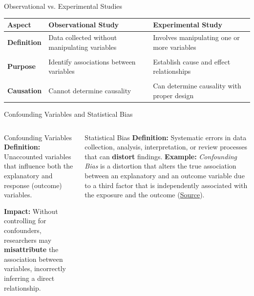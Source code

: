 \documentclass[handout]{beamer} %
\begin{document}
\begin{frame}{Observational vs. Experimental Studies}
    \begin{tabular}{ l | p{} | p{} }
        \textbf{Aspect} & \textbf{Observational Study} & \textbf{Experimental Study} \\
        \hline
        \textbf{Definition} & Data collected without manipulating variables & Involves manipulating one or more variables \\ \pause  %
        & & \\
        \textbf{Purpose} & Identify associations between variables & Establish cause and effect relationships \\ \pause  %
                & & \\
        \textbf{Causation} & Cannot determine causality & Can determine causality with proper design \\
    \end{tabular}
\end{frame}

\begin{frame}{Confounding Variables and Statistical Bias}

    \begin{columns}[T] %
            \begin{block}{Confounding Variables}
                \textbf{Definition:} Unaccounted variables that influence both the explanatory and response (outcome) variables. \pause %
                
                \vspace{0.2cm}
                
                \textbf{Impact:} Without controlling for confounders, researchers may \textbf{misattribute} the association between variables, incorrectly inferring a direct relationship. \pause %
            \end{block}
        
            \begin{block}{Statistical Bias}
                \textbf{Definition:} Systematic errors in data collection, analysis, interpretation, or review processes that can \textbf{distort} findings.
                \pause %
                \vspace{0.2cm}
                \textbf{Example:} \textit{Confounding Bias} is a distortion that alters the true association between an explanatory and an outcome variable due to a third factor that is independently associated with the exposure and the outcome (\href{https://catalogofbias.org/biases/confounding/}{Source}).
            \end{block}
    \end{columns}

\end{frame}
\end{document}
